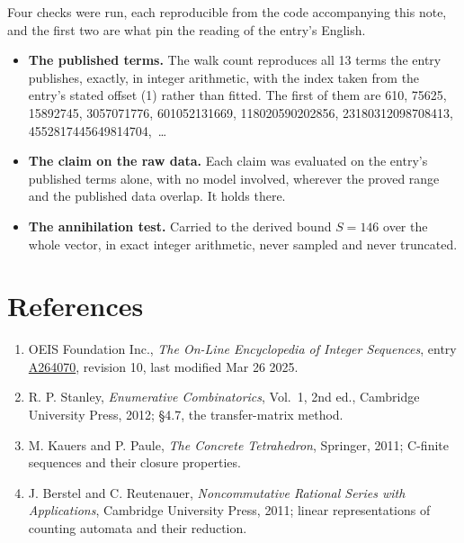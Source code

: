 \documentclass[11pt]{article}
\theoremstyle{definition}
\begin{document}
Four checks were run, each reproducible from the code accompanying this note, and the first two are what pin the reading of the entry's English.

\begin{itemize}

\item {\bfseries The published terms.} The walk count reproduces all 13 terms the entry publishes, exactly, in integer arithmetic, with the index taken from the entry's stated offset (1) rather than fitted. The first of them are 610, 75625, 15892745, 3057071776, 601052131669, 118020590202856, 23180312098708413, 4552817445649814704,~\dots

\item {\bfseries The claim on the raw data.} Each claim was evaluated on the entry's published terms alone, with no model involved, wherever the proved range and the published data overlap. It holds there.

\item {\bfseries The annihilation test.} Carried to the derived bound $S = 146$ over the whole vector, in exact integer arithmetic, never sampled and never truncated.

\end{itemize}

\section{References}

\begin{enumerate}

\item OEIS Foundation Inc., \emph{The On-Line Encyclopedia of Integer Sequences}, entry \href{https://oeis.org/A264070}{A264070}, revision 10, last modified Mar 26 2025.

\item R. P. Stanley, \emph{Enumerative Combinatorics}, Vol.~1, 2nd ed., Cambridge University Press, 2012; \S4.7, the transfer-matrix method.

\item M. Kauers and P. Paule, \emph{The Concrete Tetrahedron}, Springer, 2011; C-finite sequences and their closure properties.

\item J. Berstel and C. Reutenauer, \emph{Noncommutative Rational Series with Applications}, Cambridge University Press, 2011; linear representations of counting automata and their reduction.

\end{enumerate}
\end{document}
